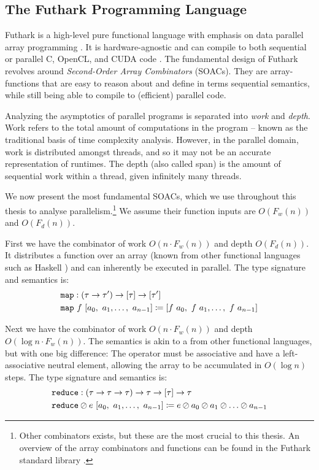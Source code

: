 \subsection{The Futhark Programming Language}
\label{subsec:futhark}

Futhark is a high-level pure functional language with emphasis on data parallel
array programming
\cite{ParallelProgrammingInFuthark,Henriksen:2017:FPF:3062341.3062354}. It is
hardware-agnostic and can compile to both sequential or parallel C, OpenCL, and
CUDA code \cite{futguide}. The fundamental design of Futhark revolves around
\textit{Second-Order Array Combinators} (SOACs). They are array-functions that
are easy to reason about and define in terms sequential semantics, while still
being able to compile to (efficient) parallel code.

Analyzing the asymptotics of parallel programs is separated into \textit{work}
and \textit{depth}. Work refers to the total amount of computations in the
program -- known as the traditional basis of time complexity analysis. However,
in the parallel domain, work is distributed amongst threads, and so it may not
be an accurate representation of runtimes. The depth (also called span) is the
amount of sequential work within a thread, given infinitely many threads.

We now present the most fundamental SOACs, which we use throughout this thesis
to analyse parallelism.\footnote{Other combinators exists, but these are the
  most crucial to this thesis. An overview of the array combinators and
  functions can be found in the Futhark standard library \cite{futprelude}.} We
assume their function inputs are $O(F_{w}(n))$ and $O(F_d(n))$.

First we have the combinator  of work $O(n\cdot F_w(n))$ and depth
$O(F_d(n))$. It distributes a function over an array (known from other
functional languages such as Haskell \cite{marlow2010haskell}) and can
inherently be executed in parallel. The type signature and semantics is:
\begin{align}
  &\mathtt{map}:(\tau \to \tau') \to \mathtt{[}\tau\mathtt{]} \to \mathtt{[}\tau'\mathtt{]}\\
  &\mathtt{map}~f~[a_0,~a_1,\ldots,~a_{n-1}] \coloneq [f~a_0,~f~a_1,\ldots,~f~a_{n-1}]
\end{align}

Next we have the combinator  of work $O(n\cdot F_w(n))$ and depth
$O(\log n \cdot F_w(n))$.  The semantics is akin to a  from other
functional languages, but with one big difference: The operator must be
associative and have a left-associative neutral element, allowing the array to
be accumulated in $O(\log n)$ steps. The type signature and semantics is:
\begin{align}
  &\mathtt{reduce}:(\tau \to \tau \to \tau) \to \tau \to \mathtt{[}\tau\mathtt{]} \to \tau\\
  & \mathtt{reduce} \oslash e~[a_0,~a_1,\ldots,~a_{n-1}] \coloneq e \oslash a_0 \oslash a_1 \oslash \ldots\oslash a_{n-1}
\end{align}

